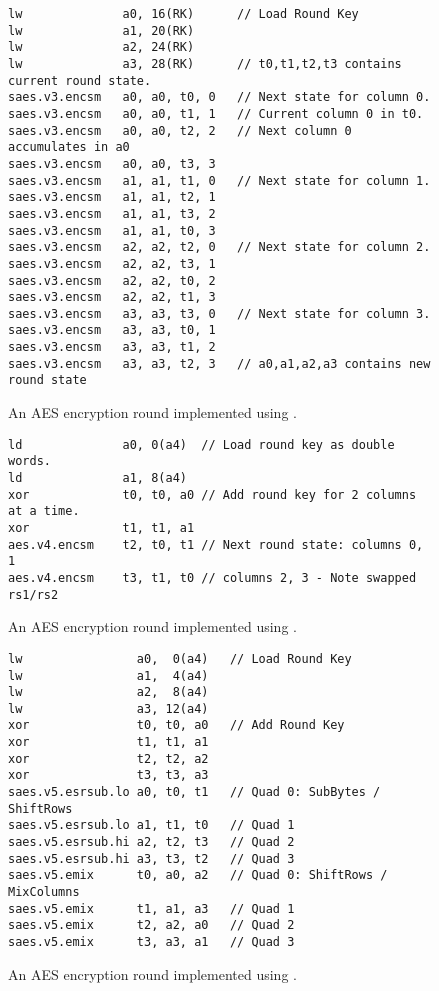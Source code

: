 \begin{figure}[!h]
\begin{lstlisting}[language=pseudo,style=block]
lw              a0, 16(RK)      // Load Round Key
lw              a1, 20(RK)
lw              a2, 24(RK)
lw              a3, 28(RK)      // t0,t1,t2,t3 contains current round state.
saes.v3.encsm   a0, a0, t0, 0   // Next state for column 0.
saes.v3.encsm   a0, a0, t1, 1   // Current column 0 in t0.
saes.v3.encsm   a0, a0, t2, 2   // Next column 0 accumulates in a0
saes.v3.encsm   a0, a0, t3, 3
saes.v3.encsm   a1, a1, t1, 0   // Next state for column 1.
saes.v3.encsm   a1, a1, t2, 1
saes.v3.encsm   a1, a1, t3, 2
saes.v3.encsm   a1, a1, t0, 3
saes.v3.encsm   a2, a2, t2, 0   // Next state for column 2.
saes.v3.encsm   a2, a2, t3, 1
saes.v3.encsm   a2, a2, t0, 2
saes.v3.encsm   a2, a2, t1, 3
saes.v3.encsm   a3, a3, t3, 0   // Next state for column 3.
saes.v3.encsm   a3, a3, t0, 1
saes.v3.encsm   a3, a3, t1, 2
saes.v3.encsm   a3, a3, t2, 3   // a0,a1,a2,a3 contains new round state
\end{lstlisting}
\caption{
  An AES encryption round implemented using .
}

\label{fig:v3:round}
\end{figure}
\begin{figure}[!h]
\begin{lstlisting}[language=pseudo,style=block]
ld              a0, 0(a4)  // Load round key as double words.
ld              a1, 8(a4)
xor             t0, t0, a0 // Add round key for 2 columns at a time.
xor             t1, t1, a1
aes.v4.encsm    t2, t0, t1 // Next round state: columns 0, 1
aes.v4.encsm    t3, t1, t0 // columns 2, 3 - Note swapped rs1/rs2
\end{lstlisting}
\caption{
  An AES encryption round implemented using .
}
\label{fig:v4:round}
\end{figure}

\begin{figure}[!h]
\begin{lstlisting}[language=pseudo,style=block]
lw                a0,  0(a4)   // Load Round Key
lw                a1,  4(a4)
lw                a2,  8(a4)
lw                a3, 12(a4)
xor               t0, t0, a0   // Add Round Key
xor               t1, t1, a1
xor               t2, t2, a2
xor               t3, t3, a3
saes.v5.esrsub.lo a0, t0, t1   // Quad 0: SubBytes / ShiftRows
saes.v5.esrsub.lo a1, t1, t0   // Quad 1
saes.v5.esrsub.hi a2, t2, t3   // Quad 2
saes.v5.esrsub.hi a3, t3, t2   // Quad 3
saes.v5.emix      t0, a0, a2   // Quad 0: ShiftRows / MixColumns
saes.v5.emix      t1, a1, a3   // Quad 1
saes.v5.emix      t2, a2, a0   // Quad 2
saes.v5.emix      t3, a3, a1   // Quad 3
\end{lstlisting}
\caption{
  An AES encryption round implemented using .
}
\label{fig:v5:round}
\end{figure}
